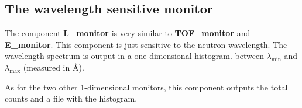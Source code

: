 

\subsection*{The wavelength sensitive monitor}
\label{s:L_monitor}


The component \textbf{L\_monitor} is very similar to
\textbf{TOF\_monitor} and \textbf{E\_monitor}.
This component is just sensitive to the neutron wavelength.
The wavelength spectrum is output in a one-dimensional histogram.
between $\lambda_\textrm{min}$ and $\lambda_\textrm{max}$ (measured in \AA ).

As for the two other 1-dimensional monitors, this component outputs
the total counts and a file with the histogram.

